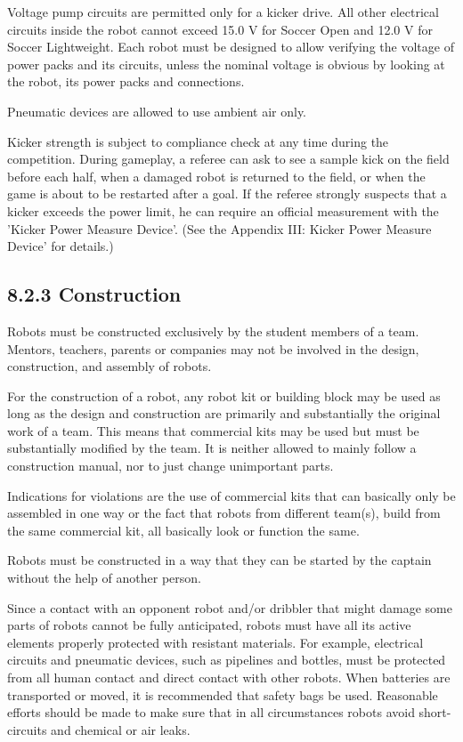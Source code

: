 \documentclass{article}
\begin{document}
Voltage pump circuits are permitted only for a kicker drive. All other electrical circuits inside the robot cannot exceed 15.0 V for Soccer Open and 12.0 V for Soccer Lightweight. Each robot must be designed to allow verifying the voltage of power packs and its circuits, unless the nominal voltage is obvious by looking at the robot, its power packs and connections.

Pneumatic devices are allowed to use ambient air only.

Kicker strength is subject to compliance check at any time during the competition. During gameplay, a referee can ask to see a sample kick on the field before each half, when a damaged robot is returned to the field, or when the game is about to be restarted after a goal. If the referee strongly suspects that a kicker exceeds the power limit, he can require an official measurement with the 'Kicker Power Measure Device'. (See the Appendix III: Kicker Power Measure Device' for details.)

\subsection{8.2.3 Construction \label{ref-057}}

Robots must be constructed exclusively by the student members of a team. Mentors, teachers, parents or companies may not be involved in the design, construction, and assembly of robots.

For the construction of a robot, any robot kit or building block may be used as long as the design and construction are primarily and substantially the original work of a team. This means that commercial kits may be used but must be substantially modified by the team. It is neither allowed to mainly follow a construction manual, nor to just change unimportant parts.

Indications for violations are the use of commercial kits that can basically only be assembled in one way or the fact that robots from different team(s), build from the same commercial kit, all basically look or function the same.

Robots must be constructed in a way that they can be started by the captain without the help of another person.

Since a contact with an opponent robot and/or dribbler that might damage some parts of robots cannot be fully anticipated, robots must have all its active elements properly protected with resistant materials. For example, electrical circuits and pneumatic devices, such as pipelines and bottles, must be protected from all human contact and direct contact with other robots. When batteries are transported or moved, it is recommended that safety bags be used. Reasonable efforts should be made to make sure that in all circumstances robots avoid short-circuits and chemical or air leaks.
\end{document}
